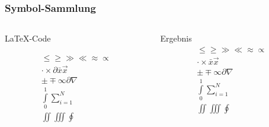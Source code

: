 \begin{frame}[fragile]
    \frametitle{Symbol-Sammlung}
    \begin{columns}[T]
        \begin{column}{0.7\textwidth}
            \begin{block}{\LaTeX-Code}
                \begin{lstverbatim}
                \begin{align}
                    \leq \geq \gg \ll \approx \propto \\
                    \cdot \times \partial \bar{x} \vec{x} \\
                    \pm \mp \infty \partial \nabla \\
                    \int\limits_0^1 \sum\limits_{i=1}^N \\
                    \iint \iiint \oint
                \end{align}
                \end{lstverbatim}
            \end{block}
        \end{column}
        \begin{column}{0.25\textwidth}
            \begin{block}{Ergebnis}
                \begin{align*}
                    \leq \geq \gg \ll \approx \propto \\
                    \cdot \times \bar{x} \vec{x} \\
                    \pm \mp \infty \partial \nabla \\
                    \int\limits_0^1 \sum\limits_{i=1}^N \\
                    \iint \iiint \oint
                \end{align*}
            \end{block}
        \end{column}
    \end{columns}
\end{frame}
